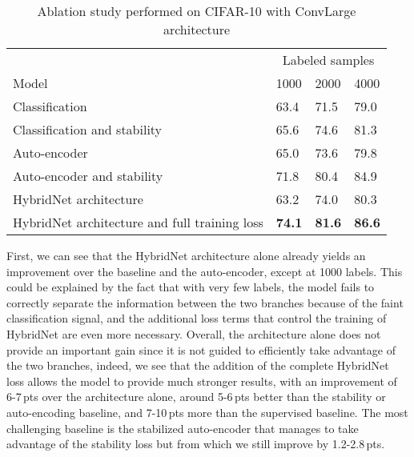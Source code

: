 \documentclass[runningheads]{llncs}
\begin{document}
\begin{table}[tb]
  \setlength{\tabcolsep}{4pt}
  \caption{Ablation study performed on CIFAR-10 with ConvLarge architecture}
  \label{table:ablation}
  \centering
  \begin{tabular}{llll}
    \toprule
                                              & \multicolumn{3}{c}{Labeled samples}           \\ \cmidrule{2-4}
Model                                         & 1000          & 2000          & 4000          \\ \midrule
Classification                                & 63.4          & 71.5          & 79.0          \\
Classification and stability                  & 65.6          & 74.6          & 81.3          \\ \cmidrule{1-4}
Auto-encoder                                & 65.0          & 73.6          & 79.8          \\
Auto-encoder and stability                  & 71.8          & 80.4          & 84.9          \\ \cmidrule{1-4}

HybridNet architecture                        & 63.2          & 74.0          & 80.3          \\
HybridNet architecture and full training loss & \textbf{74.1} & \textbf{81.6} & \textbf{86.6} \\ \bottomrule
  \end{tabular}
\end{table}


First, we can see that the HybridNet architecture alone already yields an improvement over the baseline and the auto-encoder, except at 1000 labels. This could be explained by the fact that with very few labels, the model fails to correctly separate the information between the two branches because of the faint classification signal, and the additional loss terms that control the training of HybridNet are even more necessary. Overall, the architecture alone does not provide an important gain since it is not guided to efficiently take advantage of the two branches, indeed, we see that the addition of the complete HybridNet loss allows the model to provide much stronger results, with an improvement of 6-7\,pts over the architecture alone, around 5-6\,pts better than the stability or auto-encoding baseline, and 7-10\,pts more than the supervised baseline. The most challenging baseline is the stabilized auto-encoder that manages to take advantage of the stability loss but from which we still improve by 1.2-2.8\,pts.
\end{document}
